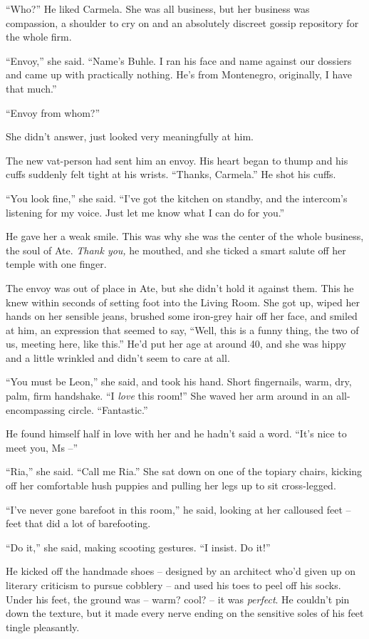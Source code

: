 “Who?” He liked Carmela. She was all business, but her business was 
compassion, a shoulder to cry on and an absolutely discreet gossip 
repository for the whole firm.

“Envoy,” she said. “Name's Buhle. I ran his face and name against 
our dossiers and came up with practically nothing. He's from 
Montenegro, originally, I have that much.”

“Envoy from whom?”

She didn't answer, just looked very meaningfully at him.

The new vat-person had sent him an envoy. His heart began to thump and 
his cuffs suddenly felt tight at his wrists. “Thanks, Carmela.” He 
shot his cuffs.

“You look fine,” she said. “I've got the kitchen on standby, and 
the intercom's listening for my voice. Just let me know what I can do 
for you.”

He gave her a weak smile. This was why she was the center of the whole 
business, the soul of Ate. \emph{Thank you,} he mouthed, and she ticked 
a smart salute off her temple with one finger.

\tb

The envoy was out of place in Ate, but she didn't hold it against them. 
This he knew within seconds of setting foot into the Living Room. She 
got up, wiped her hands on her sensible jeans, brushed some iron-grey 
hair off her face, and smiled at him, an expression that seemed to say, 
“Well, this is a funny thing, the two of us, meeting here, like 
this.” He'd put her age at around 40, and she was hippy and a little 
wrinkled and didn't seem to care at all.

“You must be Leon,” she said, and took his hand. Short fingernails, 
warm, dry, palm, firm handshake. “I \emph{love} this room!” She 
waved her arm around in an all-encompassing circle. “Fantastic.”

He found himself half in love with her and he hadn't said a word. 
“It's nice to meet you, Ms --”

“Ria,” she said. “Call me Ria.” She sat down on one of the 
topiary chairs, kicking off her comfortable hush puppies and pulling 
her legs up to sit cross-legged.

“I've never gone barefoot in this room,” he said, looking at her 
calloused feet -- feet that did a lot of barefooting.

“Do it,” she said, making scooting gestures. “I insist. Do it!”

He kicked off the handmade shoes -- designed by an architect who'd 
given up on literary criticism to pursue cobblery -- and used his toes 
to peel off his socks. Under his feet, the ground was -- warm? cool? -- 
it was \emph{perfect}. He couldn't pin down the texture, but it made 
every nerve ending on the sensitive soles of his feet tingle pleasantly.

